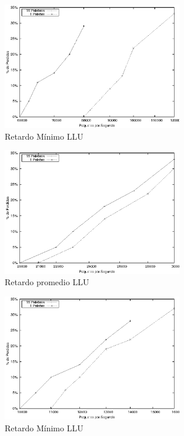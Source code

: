 \begin{figure}[!h]
  \centering
	\includegraphics[width=0.7\textwidth]{5-resultados/graf/llumin.eps}
  \caption{Retardo Mínimo LLU}
  \label{fig}
\end{figure}
\begin{figure}[!h]
  \centering
	\includegraphics[width=0.7\textwidth]{5-resultados/graf/lluprom.eps}
  \caption{Retardo promedio LLU}
  \label{fig}
\end{figure}
\begin{figure}[!th]
  \centering
	\includegraphics[width=0.7\textwidth]{5-resultados/graf/llumax.eps}
  \caption{Retardo Mínimo LLU}
  \label{fig}
\end{figure}



